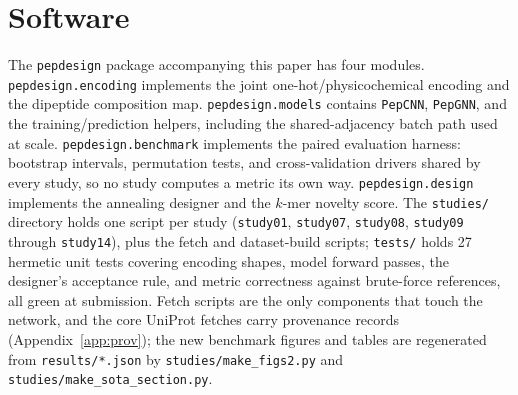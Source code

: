 \section{Software}\label{sec:software}
The \texttt{pepdesign} package accompanying this paper has four modules.
\texttt{pepdesign.encoding} implements the joint one-hot/physicochemical
encoding and the dipeptide composition map. \texttt{pepdesign.models}
contains \texttt{PepCNN}, \texttt{PepGNN}, and the training/prediction
helpers, including the shared-adjacency batch path used at scale.
\texttt{pepdesign.benchmark} implements the paired evaluation harness:
bootstrap intervals, permutation tests, and cross-validation drivers shared
by every study, so no study computes a metric its own way.
\texttt{pepdesign.design} implements the annealing designer and the $k$-mer
novelty score. The \texttt{studies/} directory holds one script per study
(\texttt{study01}, \texttt{study07}, \texttt{study08}, \texttt{study09} through \texttt{study14}),
plus the fetch and dataset-build scripts; \texttt{tests/} holds 27 hermetic
unit tests covering encoding shapes, model forward passes, the designer's
acceptance rule, and metric correctness against brute-force references, all
green at submission. Fetch scripts are the only components that touch the
network, and the core UniProt fetches carry provenance records
(Appendix~\ref{app:prov}); the new benchmark figures and tables are regenerated from \texttt{results/*.json}
by \texttt{studies/make\_figs2.py} and \texttt{studies/make\_sota\_section.py}.
